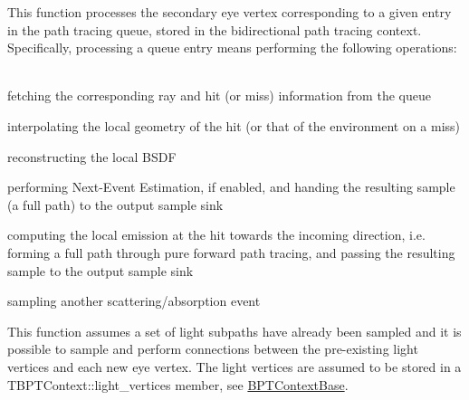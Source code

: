 \begin{DoxyParagraph}{}
This function processes the secondary eye vertex corresponding to a given entry in the path tracing queue, stored in the bidirectional path tracing context. Specifically, processing a queue entry means performing the following operations\+: ~\newline

\begin{DoxyItemize}
\item fetching the corresponding ray and hit (or miss) information from the queue
\item interpolating the local geometry of the hit (or that of the environment on a miss)
\item reconstructing the local B\+S\+DF
\item performing Next-\/\+Event Estimation, if enabled, and handing the resulting sample (a full path) to the output sample sink
\item computing the local emission at the hit towards the incoming direction, i.\+e. forming a full path through pure forward path tracing, and passing the resulting sample to the output sample sink
\item sampling another scattering/absorption event 
\end{DoxyItemize}
\end{DoxyParagraph}
\begin{DoxyParagraph}{}
This function assumes a set of light subpaths have already been sampled and it is possible to sample and perform connections between the pre-\/existing light vertices and each new eye vertex. The light vertices are assumed to be stored in a T\+B\+P\+T\+Context\+::light\+\_\+vertices member, see \hyperlink{struct_b_p_t_context_base}{B\+P\+T\+Context\+Base}.
\end{DoxyParagraph}

